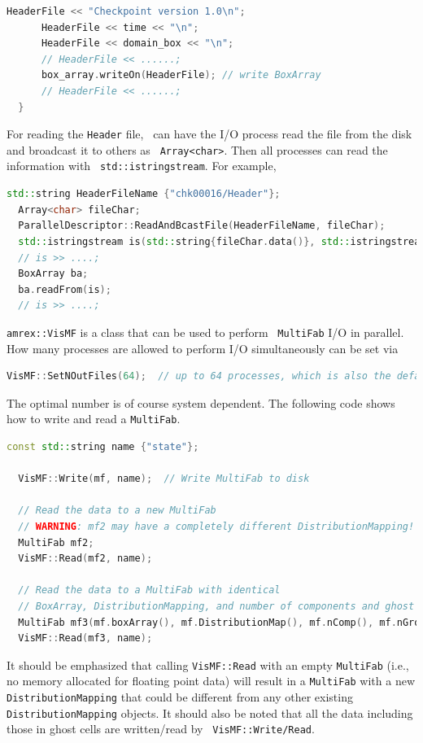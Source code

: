 {{\begin{lstlisting}[language=cpp]
      HeaderFile << "Checkpoint version 1.0\n";
      HeaderFile << time << "\n";
      HeaderFile << domain_box << "\n";
      // HeaderFile << ......;
      box_array.writeOn(HeaderFile); // write BoxArray
      // HeaderFile << ......;
  }
\end{lstlisting}
For reading the {\tt Header} file, \amrex\ can have the I/O process
read the file from the disk and broadcast it to others as {\tt
Array<char>}.  Then all processes can read the information with {\tt
std::istringstream}.  For example,
\begin{lstlisting}[language=cpp]
  std::string HeaderFileName {"chk00016/Header"};
  Array<char> fileChar;
  ParallelDescriptor::ReadAndBcastFile(HeaderFileName, fileChar);
  std::istringstream is(std::string{fileChar.data()}, std::istringstream::in);
  // is >> ....;
  BoxArray ba;
  ba.readFrom(is);
  // is >> ....;
\end{lstlisting}

{\tt amrex::VisMF} is a class that can be used to perform {\tt
  MultiFab} I/O in parallel.  How many processes are allowed to
perform I/O simultaneously can be set via
\begin{lstlisting}[language=cpp]
  VisMF::SetNOutFiles(64);  // up to 64 processes, which is also the default.
\end{lstlisting}
The optimal number is of course system dependent.  The following code
shows how to write and read a {\tt MultiFab}.
\begin{lstlisting}[language=cpp]
  const std::string name {"state"};

  VisMF::Write(mf, name);  // Write MultiFab to disk

  // Read the data to a new MultiFab
  // WARNING: mf2 may have a completely different DistributionMapping!
  MultiFab mf2;
  VisMF::Read(mf2, name);

  // Read the data to a MultiFab with identical
  // BoxArray, DistributionMapping, and number of components and ghost cells.
  MultiFab mf3(mf.boxArray(), mf.DistributionMap(), mf.nComp(), mf.nGrow());
  VisMF::Read(mf3, name);
\end{lstlisting}
It should be emphasized that calling {\tt VisMF::Read} with an empty
{\tt MultiFab} (i.e., no memory allocated for floating point data)
will result in a {\tt MultiFab} with a new {\tt DistributionMapping}
that could be different from any other existing {\tt
DistributionMapping} objects.  It should also be noted that all the
data including those in ghost cells are written/read by {\tt
VisMF::Write/Read}. 

}}
